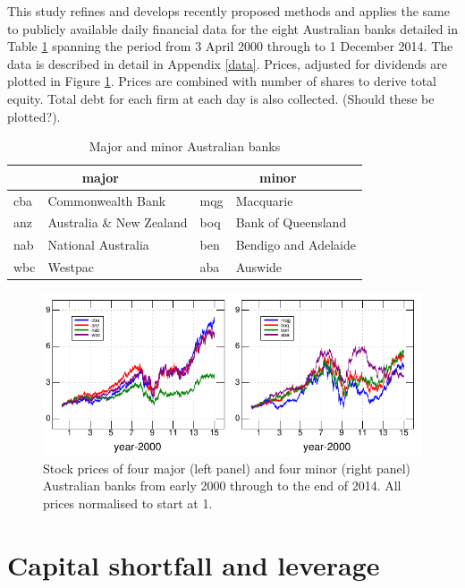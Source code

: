 \documentclass[authoryear]{elsarticle}
\newcommand{\fref}[1]{Figure \ref{#1}}
\newcommand{\tref}[1]{Table \ref{#1}}
\newcommand{\aref}[1]{Appendix \ref{#1}}
\begin{document}
This study refines and develops recently proposed methods and applies the same to publicly available daily financial data for  the eight  Australian banks detailed in \tref{eightbanks} spanning the period from   3 April 2000 through to 1 December 2014.  The data is described in detail in \aref{data}.  Prices, adjusted for dividends are plotted in \fref{prices}.   Prices are combined with number of shares to derive total equity.    Total debt for each firm at each day is also collected.  (Should these be plotted?).

\begin{table}[htdp]
\label{banks}\caption{Major and minor Australian banks}\label{eightbanks}
\begin{center}
\begin{tabular}{l|l||l|l}
\hline
 \multicolumn{2}{c||}{major}& \multicolumn{2}{c}{minor}\\
 \hline
cba & Commonwealth Bank  & mqg & Macquarie \\
anz & Australia \& New Zealand  & boq & Bank of Queensland\\
nab & National Australia  & ben & Bendigo and Adelaide \\
wbc & Westpac & aba & Auswide \\
\hline
\end{tabular}
\end{center}
\end{table}%


\begin{figure}[htbp]
\begin{center}
\includegraphics{figures/prices.pdf}
\caption{Stock  prices of four major (left panel) and four minor (right panel) Australian banks from early 2000 through to the end of 2014.  All prices normalised to start at 1.}
\label{prices}
\end{center}
\end{figure}


\section{Capital shortfall and leverage}
\end{document}
